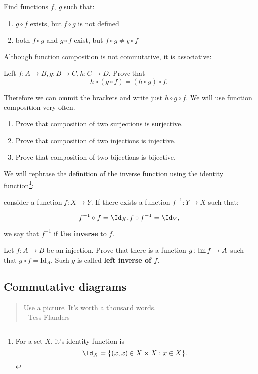 \begin{exercise}
	Find functions $f,~g$ such that:
	\begin{enumerate}
		\item $g\circ f$ exists, but $f\circ g$ is not defined
		\item both $f\circ g$ and $g\circ f$ exist, but $f\circ g\neq g\circ f$
	\end{enumerate}
\end{exercise}

Although function composition is not commutative, it is associative:
\begin{exercise}
	Left $f:A\to B, g: B\to C, h: C\to D$. Prove that
	$$h\circ (g\circ f) = (h\circ g)\circ f.$$
\end{exercise}
Therefore we can ommit the brackets and write just $h\circ g\circ f.$ We will use function composition very
often.

\begin{exercise}
    \begin{enumerate}
	   \item Prove that composition of two surjections is surjective.
	   \item Prove that composition of two injections is injective.
	   \item Prove that composition of two bijections is bijective.
    \end{enumerate}
\end{exercise}

\begin{definition} We will rephrase the definition of the inverse function using the identity function\footnote{For a set $X$, it's identity function is
    $$\Id_X=\{(x,x)\in X\times X : x\in X\}.$$}:

    consider a function $f:X\to Y$. If there exists a function $f^{-1}:Y\to X$ such that:

    $$f^{-1}\circ f=\Id_X,  f\circ f^{-1}=\Id_Y,$$

    we say that $f^{-1}$ if \textbf{the inverse} to $f$.
\end{definition}

\begin{exercise}
  Let $f: A\to B$ be an injection. Prove that there is a function
  $g: \text{Im\,} f \to A$ such that $g\circ f = \text{Id}_A.$
  Such $g$ is called \textbf{left inverse of $f$}.
\end{exercise}

\subsection{Commutative diagrams}
\begin{quote}
  Use a picture. It's worth a thousand words.\\
  - Tess Flanders
\end{quote}

